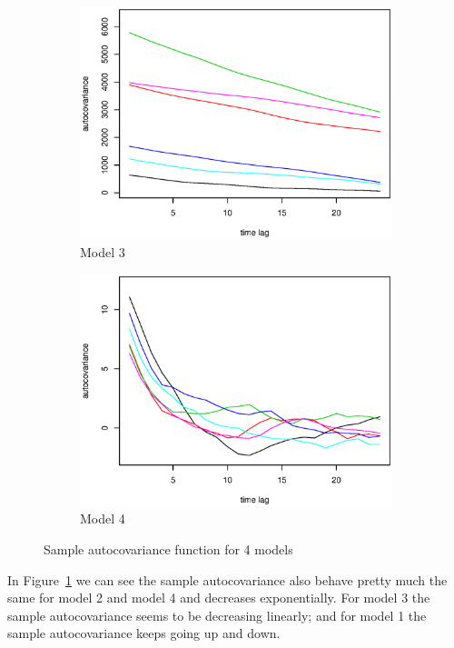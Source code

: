 \documentclass{article}
\begin{document}
\begin{figure}[!htb]
\begin{subfigure}[b]{0.45\textwidth}
 	\includegraphics[width = \textwidth]{Model3acv.eps}
 	\caption{Model 3}
 	\end{subfigure}%
 	\begin{subfigure}[b]{0.45\textwidth}
 	\includegraphics[width = \textwidth]{Model4acv.eps}
 	\caption{Model 4}
 	\end{subfigure}
 	\caption{Sample autocovariance function for 4 models}
 	\label{acv}
 \end{figure} 
 \newpage
 In Figure~\ref{acv} we can see the sample autocovariance also behave pretty much the same for model 2 and model 4 and decreases exponentially. For model 3 the sample autocovariance seems to be decreasing linearly; and for model 1 the sample autocovariance keeps going up and down.  

	











	
	
	
	
\end{document}
